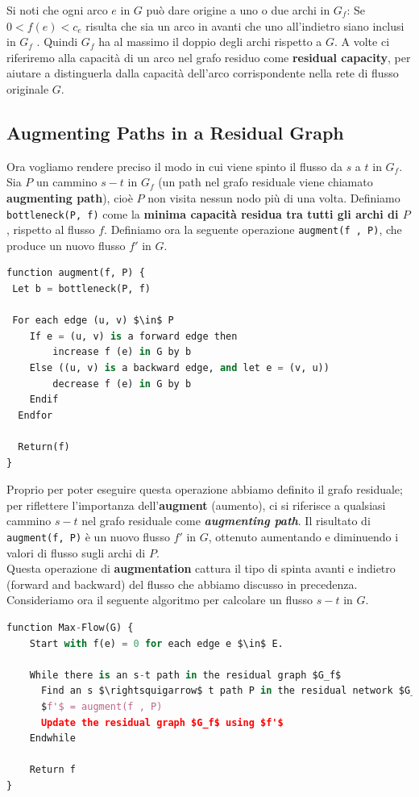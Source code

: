 Si noti che ogni arco $e$ in $G$ può dare origine a uno o due archi
in $G_f$: Se $0 < f (e) < c_e$ risulta che sia un arco in avanti
che uno all'indietro siano inclusi in $G_f$ . Quindi $G_f$ ha al
massimo il doppio degli archi rispetto a $G$. A volte ci riferiremo
alla capacità di un arco nel grafo residuo come \textbf{residual
  capacity}, per aiutare a distinguerla dalla capacità dell'arco
corrispondente nella rete di flusso originale $G$.


\subsection{Augmenting Paths in a Residual Graph}

Ora vogliamo rendere preciso il modo in cui viene spinto il flusso da
$s$ a $t$ in $G_f$. Sia $P$ un cammino $s-t$ in $G_f$ (un
path nel grafo residuale viene chiamato \textbf{augmenting path}), cioè
$P$ non visita nessun nodo più di una volta. Definiamo
\texttt{bottleneck(P,\ f)} come la \textbf{minima capacità residua tra
  tutti gli archi di $P$}, rispetto al flusso $f$. Definiamo ora la
seguente operazione \texttt{augment(f\ ,\ P)}, che produce un nuovo
flusso $f'$ in $G$.

\begin{lstlisting}[language=Python, mathescape=true]
function augment(f, P) {
 Let b = bottleneck(P, f)

 For each edge (u, v) $\in$ P
    If e = (u, v) is a forward edge then
    	increase f (e) in G by b
  	Else ((u, v) is a backward edge, and let e = (v, u))
    	decrease f (e) in G by b
  	Endif
  Endfor

  Return(f)
}
\end{lstlisting}

Proprio per poter eseguire questa operazione abbiamo definito il grafo
residuale; per riflettere l'importanza dell'\textbf{augment} (aumento),
ci si riferisce a qualsiasi cammino $s-t$ nel grafo residuale come
\textbf{\emph{augmenting path}}. Il risultato di
\texttt{augment(f,\ P)} è un nuovo flusso $f'$ in $G$, ottenuto
aumentando e diminuendo i valori di flusso sugli archi di $P$.\\

Questa operazione di \textbf{augmentation} cattura il tipo di spinta
avanti e indietro (forward and backward) del flusso che abbiamo discusso
in precedenza. Consideriamo ora il seguente algoritmo per calcolare un
flusso $s-t$ in $G$.

\begin{lstlisting}[language=Python, mathescape=true]
function Max-Flow(G) {
	Start with f(e) = 0 for each edge e $\in$ E.

	While there is an s-t path in the residual graph $G_f$
  	  Find an s $\rightsquigarrow$ t path P in the residual network $G_f$
  	  $f'$ = augment(f , P)
  	  Update the residual graph $G_f$ using $f'$
	Endwhile

	Return f
}
\end{lstlisting}

